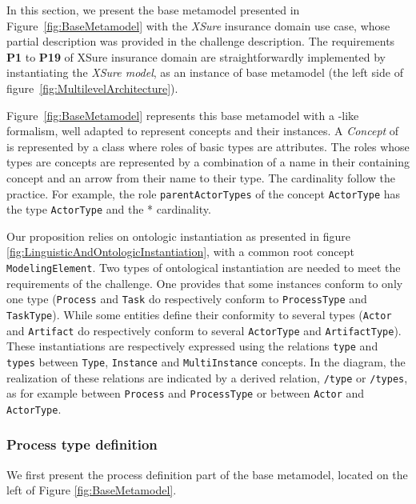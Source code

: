 In this section, we present the base metamodel presented in Figure~\ref{fig:BaseMetamodel} with the \textit{XSure} insurance domain use case, whose partial description was provided in the challenge description. The requirements \textbf{P1} to \textbf{P19} of XSure insurance domain are straightforwardly implemented by instantiating the \emph{XSure model}, as an instance of base metamodel (the left side of figure~\ref{fig:MultilevelArchitecture}).

Figure~\ref{fig:BaseMetamodel} represents this base metamodel with a \UML-like formalism, well adapted to represent \FML concepts and their instances. A \textit{Concept} of \FML is represented by a \UML class where roles of basic types are attributes. The roles whose types are concepts are represented by a combination of a name in their containing concept and an arrow from their name to their type. The cardinality follow the \UML practice.
For example, the role \texttt{parentActorTypes} of the concept \texttt{ActorType} has the type \texttt{ActorType} and the * cardinality.

Our proposition relies on ontologic instantiation as presented in figure \ref{fig:LinguisticAndOntologicInstantiation}, with a common root concept \texttt{ModelingElement}. Two types of ontological instantiation are needed to meet the requirements of the challenge. One provides that some instances conform to only one type (\texttt{Process} and \texttt{Task} do respectively conform to \texttt{ProcessType} and \texttt{TaskType}). While some entities define their conformity to several types (\texttt{Actor} and \texttt{Artifact} do respectively conform to several \texttt{ActorType} and \texttt{ArtifactType}). These instantiations are respectively expressed using the relations \texttt{type} and \texttt{types} between \texttt{Type}, \texttt{Instance} and \texttt{MultiInstance} concepts. In the diagram, the realization of these relations are indicated by a derived relation, \texttt{/type} or \texttt{/types}, as for example between \texttt{Process} and \texttt{ProcessType} or between \texttt{Actor} and \texttt{ActorType}.

\subsubsection{Process type definition}

We first present the process definition part of the base metamodel, located on the left of Figure \ref{fig:BaseMetamodel}.



